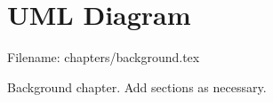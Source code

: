 \chapter{UML Diagram}
\label{ch:background}
Filename: chapters/background.tex

Background chapter. Add sections as necessary.


